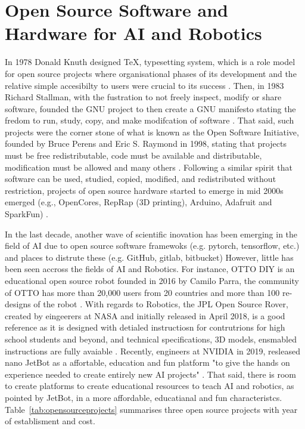 \documentclass[sigconf]{acmart}
\begin{document}
\section{Open Source Software and Hardware for AI and Robotics}
In 1978 Donald Knuth designed \TeX, typesetting system, which is a role model for open source projects where organisational phases of its development and the relative simple accesibilty to users were crucial to its success \cite{gaudeul2007}.
Then, in 1983 Richard Stallman, with the fustration to not freely inspect, modify or share software, founded the GNU project to then create a GNU manifesto stating the fredom to run, study, copy, and make modifcation of software \cite{stallman1985}.
That said, such projects were the corner stone of what is known as the Open Software Initiative, founded by Bruce Perens and Eric S. Raymond in 1998, stating that projects must be free redistributable, code must be available and distributable, modification must be allowed and many others \cite{brasseur2018}.
Following a similar spirit that software can be used, studied, copied, modified, and redistributed without restriction, projects of open source hardware started to emerge in mid 2000s emerged (e.g., OpenCores, RepRap (3D printing), Arduino, Adafruit and SparkFun) \cite{pearce2013}.

In the last decade, another wave of scientific inovation has been emerging in the field of AI due to open source software framewoks (e.g. pytorch, tensorflow, etc.) and places to distrute these (e.g. GitHub, gitlab, bitbucket) \cite{matelabs2017}
However, little has been seen accross the fields of AI and Robotics. 
For instance, OTTO DIY is an educational open source robot founded in 2016 by Camilo Parra, the community of OTTO has more than 20,000 users from 20 countries and more than 100 re-designs of the robot \cite{OttoDIY:2016}.
With regards to Robotics, the JPL Open Source Rover, created by eingeerers at NASA and initially released in April 2018, is a good reference as it is designed with detialed instructiosn for contrutrions for high school students and beyond, and technical specifications, 3D models, ensmabled instructions are fully avaiable \cite{OSR:2018}.
Recently, engineers at NVIDIA in 2019, resleased nano JetBot as a affortable, education and fun platform  "to give the hands on experience needed to create entirely new AI projects" \cite{nanoJetBot:2019}. 
That said, there is room to create platforms to create educational resources to teach AI and robotics, as pointed by JetBot, in a more affordable, educatianal and fun characteristcs.
Table~\ref{tab:opensourceprojects} summarises three open source projects with year of establisment and cost.
\end{document}
